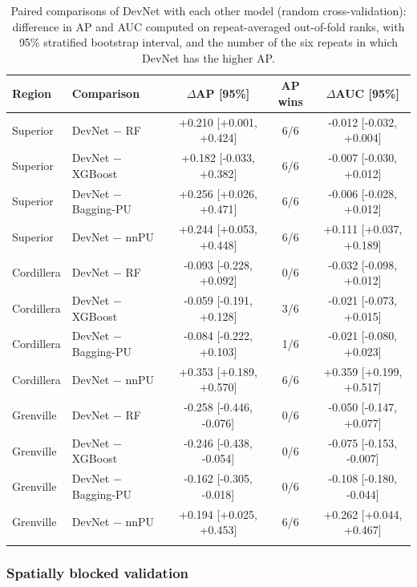 \documentclass[pdflatex,sn-apa]{sn-jnl}
\begin{document}
\begin{table}[t]
\caption{Paired comparisons of DevNet with each other model (random cross-validation): difference in AP and AUC computed on repeat-averaged out-of-fold ranks, with 95\% stratified bootstrap interval, and the number of the six repeats in which DevNet has the higher AP.}\label{tab:bootstrap}
\footnotesize
\setlength{\tabcolsep}{3pt}
\begin{tabular*}{\textwidth}{@{\extracolsep\fill}llccc}
\toprule
Region & Comparison & $\Delta$AP [95\%] & AP wins & $\Delta$AUC [95\%] \\
\midrule
Superior & DevNet $-$ RF & +0.210 [+0.001, +0.424] & 6/6 & -0.012 [-0.032, +0.004] \\
Superior & DevNet $-$ XGBoost & +0.182 [-0.033, +0.382] & 6/6 & -0.007 [-0.030, +0.012] \\
Superior & DevNet $-$ Bagging-PU & +0.256 [+0.026, +0.471] & 6/6 & -0.006 [-0.028, +0.012] \\
Superior & DevNet $-$ nnPU & +0.244 [+0.053, +0.448] & 6/6 & +0.111 [+0.037, +0.189] \\
\addlinespace
Cordillera & DevNet $-$ RF & -0.093 [-0.228, +0.092] & 0/6 & -0.032 [-0.098, +0.012] \\
Cordillera & DevNet $-$ XGBoost & -0.059 [-0.191, +0.128] & 3/6 & -0.021 [-0.073, +0.015] \\
Cordillera & DevNet $-$ Bagging-PU & -0.084 [-0.222, +0.103] & 1/6 & -0.021 [-0.080, +0.023] \\
Cordillera & DevNet $-$ nnPU & +0.353 [+0.189, +0.570] & 6/6 & +0.359 [+0.199, +0.517] \\
\addlinespace
Grenville & DevNet $-$ RF & -0.258 [-0.446, -0.076] & 0/6 & -0.050 [-0.147, +0.077] \\
Grenville & DevNet $-$ XGBoost & -0.246 [-0.438, -0.054] & 0/6 & -0.075 [-0.153, -0.007] \\
Grenville & DevNet $-$ Bagging-PU & -0.162 [-0.305, -0.018] & 0/6 & -0.108 [-0.180, -0.044] \\
Grenville & DevNet $-$ nnPU & +0.194 [+0.025, +0.453] & 6/6 & +0.262 [+0.044, +0.467] \\
\botrule
\end{tabular*}
\end{table}

\subsubsection{Spatially blocked validation}\label{sec:res-spatial}
\end{document}

